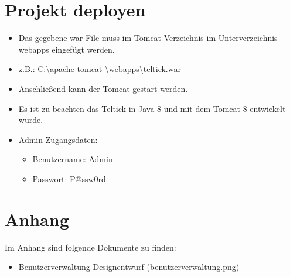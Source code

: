 \documentclass[12pt, a4paper]{article}
\begin{document}
\section{Projekt deployen}
	\begin{itemize}
		\item Das gegebene war-File muss im Tomcat Verzeichnis im Unterverzeichnis \glqq webapps\grqq{} eingefügt werden.
		\item z.B.: \glqq C:\textbackslash apache-tomcat \textbackslash webapps\textbackslash teltick.war\grqq{}
		\item Anschließend kann der Tomcat gestart werden.
		\item Es ist zu beachten das \glqq Teltick\grqq{} in Java 8 und mit dem Tomcat 8 entwickelt wurde.
		\item Admin-Zugangsdaten:
  		\begin{itemize}
        	 \item Benutzername: Admin
        	 \item Passwort: P@ssw0rd
      	\end{itemize}
	\end{itemize}
	
\section{Anhang}

Im Anhang sind folgende Dokumente zu finden:
\begin{itemize}
		\item Benutzerverwaltung Designentwurf (benutzerverwaltung.png)
\end{itemize}


\end{document}
